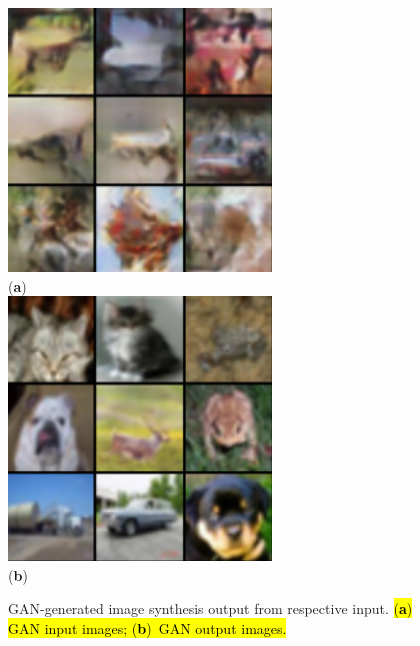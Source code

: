 \documentclass[technologies,article,accept,pdftex,moreauthors]{Definitions/mdpi}
\begin{document}
\begin{figure}[H]
\includegraphics[width=.77\linewidth]{ganin.png}\\
\text{~~~~~~~~~~~~~~~~~~~~~~~~~~~~~~~~~~~~~~~~~~~~~~~~~~~~~~~~}(\textbf{a}) 
        \label{fig:ganin} \\
        \includegraphics[width=.77\linewidth]{ganout.png}\\
\text{~~~~~~~~~~~~~~~~~~~~~~~~~~~~~~~~~~~~~~~~~~~~~~~~~~~~~~~~}(\textbf{b}) 
        \label{fig:ganout} 
    \caption{GAN-generated image synthesis output from respective input. \hl{(\textbf{a}) GAN input images; (\textbf{b})~GAN output images.}}
    \label{fig:ganresults}
\end{figure}
\end{document}
